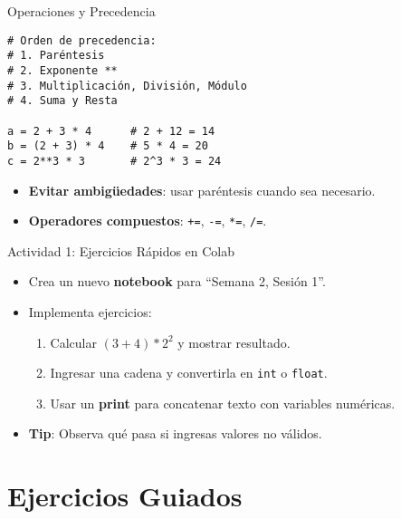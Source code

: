 \documentclass[10pt]{beamer}
\begin{document}
\begin{frame}[fragile]{Operaciones y Precedencia}
\begin{verbatim}
# Orden de precedencia:
# 1. Paréntesis
# 2. Exponente **
# 3. Multiplicación, División, Módulo
# 4. Suma y Resta

a = 2 + 3 * 4      # 2 + 12 = 14
b = (2 + 3) * 4    # 5 * 4 = 20
c = 2**3 * 3       # 2^3 * 3 = 24
\end{verbatim}
\begin{itemize}
  \item \textbf{Evitar ambigüedades}: usar paréntesis cuando sea necesario.
  \item \textbf{Operadores compuestos}: \texttt{+=}, \texttt{-=}, \texttt{*=}, \texttt{/=}.
\end{itemize}
\end{frame}

\begin{frame}{Actividad 1: Ejercicios Rápidos en Colab}
  \begin{itemize}
    \item Crea un nuevo \textbf{notebook} para “Semana 2, Sesión 1”.
    \item Implementa ejercicios:
      \begin{enumerate}
        \item Calcular \((3+4) * 2^2\) y mostrar resultado.
        \item Ingresar una cadena y convertirla en \texttt{int} o \texttt{float}.
        \item Usar un \textbf{print} para concatenar texto con variables numéricas.
      \end{enumerate}
    \item \textbf{Tip}: Observa qué pasa si ingresas valores no válidos.
  \end{itemize}
\end{frame}

\section{Ejercicios Guiados}
\end{document}

